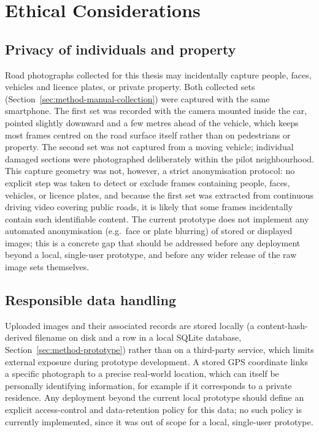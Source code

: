 \documentclass[10pt,a4paper,twocolumn]{article}
\begin{document}
\section{Ethical Considerations}
\label{sec:ethics}

\subsection{Privacy of individuals and property}
\label{sec:ethics-privacy}

Road photographs collected for this thesis may incidentally capture
people, faces, vehicles and licence plates, or private property. Both
collected sets (Section~\ref{sec:method-manual-collection}) were captured
with the same smartphone. The first set was recorded with the camera mounted
inside the car, pointed slightly downward and a few metres ahead of the
vehicle, which keeps most frames centred on the road surface itself rather
than on pedestrians or property. The second set was not captured from a
moving vehicle; individual damaged sections were photographed deliberately
within the pilot neighbourhood. This capture
geometry was not, however, a strict anonymisation protocol: no explicit
step was taken to detect or exclude frames containing people, faces,
vehicles, or licence plates, and because the first set was extracted from
continuous driving video covering public roads, it is likely that some
frames incidentally contain such identifiable content. The current
prototype does not implement any automated anonymisation (e.g.\ face or
plate blurring) of stored or displayed images; this is a concrete gap
that should be addressed before any deployment beyond a local,
single-user prototype, and before any wider release of the raw image
sets themselves.

\subsection{Responsible data handling}
\label{sec:ethics-data-handling}

Uploaded images and their associated records are stored locally (a
content-hash-derived filename on disk and a row in a local SQLite
database, Section~\ref{sec:method-prototype}) rather than on a third-party service, which limits
external exposure during prototype development. A stored GPS coordinate
links a specific photograph to a precise real-world location, which can
itself be personally identifying information, for example if it
corresponds to a private residence. Any deployment beyond the current
local prototype should define an explicit access-control and
data-retention policy for this data; no such policy is currently
implemented, since it was out of scope for a local, single-user
prototype.
\end{document}
